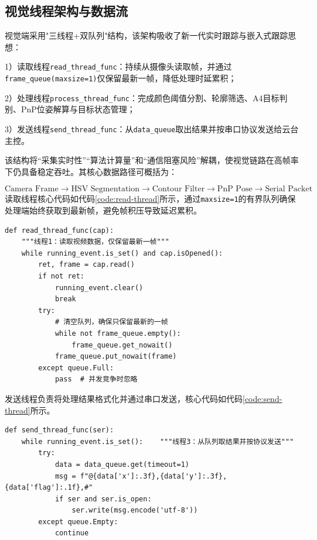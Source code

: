 \subsection{视觉线程架构与数据流}

视觉端采用"三线程+双队列"结构，该架构吸收了新一代实时跟踪与嵌入式跟踪思想\cite{zhang2024temporalcorrelationmeetsembedding}：

1）读取线程\texttt{read\_thread\_func}：持续从摄像头读取帧，并通过\texttt{frame\_queue(maxsize=1)}仅保留最新一帧，降低处理时延累积；

2）处理线程\texttt{process\_thread\_func}：完成颜色阈值分割、轮廓筛选、A4目标判别、PnP位姿解算与目标状态管理；

3）发送线程\texttt{send\_thread\_func}：从\texttt{data\_queue}取出结果并按串口协议发送给云台主控。

该结构将“采集实时性”“算法计算量”和“通信阻塞风险”解耦，使视觉链路在高帧率下仍具备稳定吞吐。其核心数据路径可概括为：

\begin{equation*}
\text{Camera Frame}\rightarrow\text{HSV Segmentation}\rightarrow\text{Contour Filter}\rightarrow\text{PnP Pose}\rightarrow\text{Serial Packet}
\end{equation*}
读取线程核心代码如代码\ref{code:read-thread}所示，通过\texttt{maxsize=1}的有界队列确保处理端始终获取到最新帧，避免帧积压导致延迟累积。

\begin{lstlisting}[style=pythonstyle, caption={视觉读取线程（EDC\_Opencv.py）}, label=code:read-thread]
def read_thread_func(cap):
    """线程1：读取视频数据，仅保留最新一帧"""
    while running_event.is_set() and cap.isOpened():
        ret, frame = cap.read()
        if not ret:
            running_event.clear()
            break
        try:
            # 清空队列，确保只保留最新的一帧
            while not frame_queue.empty():
                frame_queue.get_nowait()
            frame_queue.put_nowait(frame)
        except queue.Full:
            pass  # 并发竞争时忽略
\end{lstlisting}

发送线程负责将处理结果格式化并通过串口发送，核心代码如代码\ref{code:send-thread}所示。

\begin{lstlisting}[style=pythonstyle, caption={视觉发送线程与串口协议帧（EDC\_Opencv.py）}, label=code:send-thread]
def send_thread_func(ser):
    while running_event.is_set():    """线程3：从队列取结果并按协议发送"""
        try:
            data = data_queue.get(timeout=1)
            msg = f"@{data['x']:.3f},{data['y']:.3f},{data['flag']:.1f},#"  
            if ser and ser.is_open:
                ser.write(msg.encode('utf-8'))
        except queue.Empty:
            continue
\end{lstlisting}
